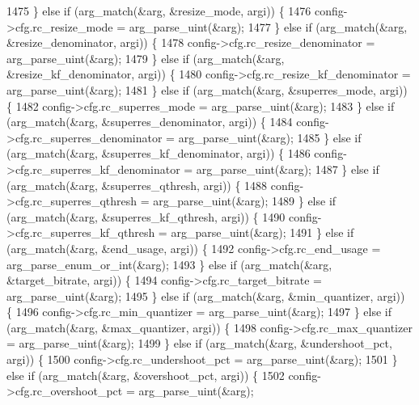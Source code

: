 \begin{DoxyCodeInclude}
{{{{{{{{{{{{{{{{{1475     \} \textcolor{keywordflow}{else} \textcolor{keywordflow}{if} (arg\_match(&arg, &resize\_mode, argi)) \{
1476       config->cfg.rc\_resize\_mode = arg\_parse\_uint(&arg);
1477     \} \textcolor{keywordflow}{else} \textcolor{keywordflow}{if} (arg\_match(&arg, &resize\_denominator, argi)) \{
1478       config->cfg.rc\_resize\_denominator = arg\_parse\_uint(&arg);
1479     \} \textcolor{keywordflow}{else} \textcolor{keywordflow}{if} (arg\_match(&arg, &resize\_kf\_denominator, argi)) \{
1480       config->cfg.rc\_resize\_kf\_denominator = arg\_parse\_uint(&arg);
1481     \} \textcolor{keywordflow}{else} \textcolor{keywordflow}{if} (arg\_match(&arg, &superres\_mode, argi)) \{
1482       config->cfg.rc\_superres\_mode = arg\_parse\_uint(&arg);
1483     \} \textcolor{keywordflow}{else} \textcolor{keywordflow}{if} (arg\_match(&arg, &superres\_denominator, argi)) \{
1484       config->cfg.rc\_superres\_denominator = arg\_parse\_uint(&arg);
1485     \} \textcolor{keywordflow}{else} \textcolor{keywordflow}{if} (arg\_match(&arg, &superres\_kf\_denominator, argi)) \{
1486       config->cfg.rc\_superres\_kf\_denominator = arg\_parse\_uint(&arg);
1487     \} \textcolor{keywordflow}{else} \textcolor{keywordflow}{if} (arg\_match(&arg, &superres\_qthresh, argi)) \{
1488       config->cfg.rc\_superres\_qthresh = arg\_parse\_uint(&arg);
1489     \} \textcolor{keywordflow}{else} \textcolor{keywordflow}{if} (arg\_match(&arg, &superres\_kf\_qthresh, argi)) \{
1490       config->cfg.rc\_superres\_kf\_qthresh = arg\_parse\_uint(&arg);
1491     \} \textcolor{keywordflow}{else} \textcolor{keywordflow}{if} (arg\_match(&arg, &end\_usage, argi)) \{
1492       config->cfg.rc\_end\_usage = arg\_parse\_enum\_or\_int(&arg);
1493     \} \textcolor{keywordflow}{else} \textcolor{keywordflow}{if} (arg\_match(&arg, &target\_bitrate, argi)) \{
1494       config->cfg.rc\_target\_bitrate = arg\_parse\_uint(&arg);
1495     \} \textcolor{keywordflow}{else} \textcolor{keywordflow}{if} (arg\_match(&arg, &min\_quantizer, argi)) \{
1496       config->cfg.rc\_min\_quantizer = arg\_parse\_uint(&arg);
1497     \} \textcolor{keywordflow}{else} \textcolor{keywordflow}{if} (arg\_match(&arg, &max\_quantizer, argi)) \{
1498       config->cfg.rc\_max\_quantizer = arg\_parse\_uint(&arg);
1499     \} \textcolor{keywordflow}{else} \textcolor{keywordflow}{if} (arg\_match(&arg, &undershoot\_pct, argi)) \{
1500       config->cfg.rc\_undershoot\_pct = arg\_parse\_uint(&arg);
1501     \} \textcolor{keywordflow}{else} \textcolor{keywordflow}{if} (arg\_match(&arg, &overshoot\_pct, argi)) \{
1502       config->cfg.rc\_overshoot\_pct = arg\_parse\_uint(&arg);
}}}}}}}}}}}}}}}}}
\end{DoxyCodeInclude}
